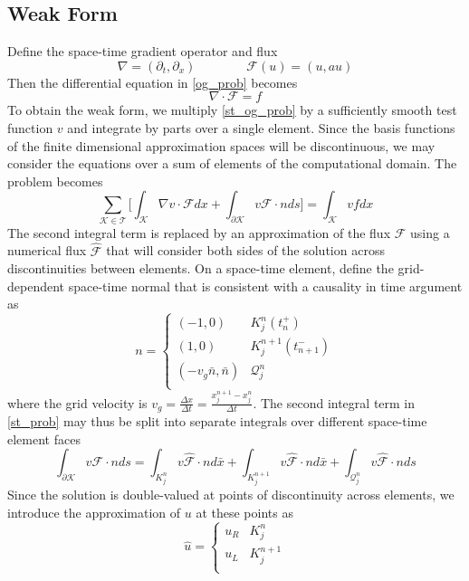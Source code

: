 \documentclass[11pt, oneside]{article}   	%
\begin{document}
\subsection{Weak Form}
Define the space-time gradient operator and flux
\[ \nabla = (\partial_t, \partial_x) \qquad\qquad \mathcal{F}(u) = (u, au) \]
Then the differential equation in \eqref{og_prob} becomes
\begin{equation}\label{st_og_prob}
 \nabla \cdot \mathcal{F} = f 
\end{equation}
To obtain the weak form, we multiply \eqref{st_og_prob} by a sufficiently smooth test function $v$ and integrate by parts over a single element.
Since the basis functions of the finite dimensional approximation spaces will be discontinuous, we may consider the equations over a sum of elements of the computational domain.
The problem becomes
\begin{equation}\label{st_prob}
 \sum_{\mathcal{K} \in \mathcal{T}} \bigg[ \int_{\mathcal{K}}\nabla v \cdot\mathcal{F}dx + \int_{\partial\mathcal{K}}v\mathcal{F}\cdot nds \bigg]  = 
 \int_{\mathcal{K}} v f dx
\end{equation}
The second integral term is replaced by an approximation of the flux $\mathcal{F}$ using a numerical flux $\hat{\mathcal{F}}$ that will consider both sides of the solution across discontinuities between elements.
On a space-time element, define the grid-dependent space-time normal that is consistent with a causality in time argument as
\[ n = \begin{cases}
	(-1,0) & K_j^n(t_{n}^+)\\
	(1,0) & K_j^{n+1}(t_{n+1}^-)\\
	(-v_g \bar{n}, \bar{n}) & \mathcal{Q}_j^n\\
	\end{cases} \]
where the grid velocity is $v_g = \frac{\Delta x}{\Delta t} = \frac{x_j^{n+1} - x_j^n}{\Delta t}$.
The second integral term in \eqref{st_prob} may thus be split into separate integrals over different space-time element faces
\begin{equation}\label{split_facets}
\int_{\partial\mathcal{K}} v \mathcal{F}\cdot n ds =
\int_{K_j^n} v \hat{\mathcal{F}} \cdot n d\bar{x} + \int_{K_j^{n+1}} v \hat{\mathcal{F}} \cdot n d\bar{x} + \int_{\mathcal{Q}_j^n} v \hat{\mathcal{F}} \cdot n ds
\end{equation}
Since the solution is double-valued at points of discontinuity across elements, we introduce the approximation of $u$ at these points as
\[ \hat{u} = \begin{cases}
	u_R & K_j^n\\
	u_L & K_j^{n+1}\\
	\end{cases} \]
\end{document}
